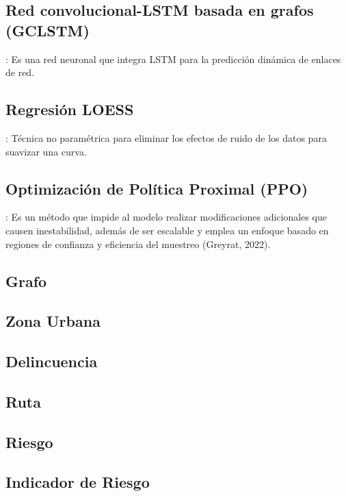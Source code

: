 \subsection{Red convolucional-LSTM basada en grafos (GCLSTM)}: Es una red neuronal que integra LSTM para la predicción dinámica de enlaces de red.
\subsection{Regresión LOESS}: Técnica no paramétrica para eliminar los efectos de ruido de los datos para suavizar una curva.

\subsection{Optimización de Política Proximal (PPO)}: Es un método que impide al modelo realizar modificaciones adicionales que causen inestabilidad, además de ser escalable y emplea un enfoque basado en regiones de confianza y eficiencia del muestreo (Greyrat, 2022).

\subsection{Grafo}

\subsection{Zona Urbana}

\subsection{Delincuencia}

\subsection{Ruta}

\subsection{Riesgo}

\subsection{Indicador de Riesgo}